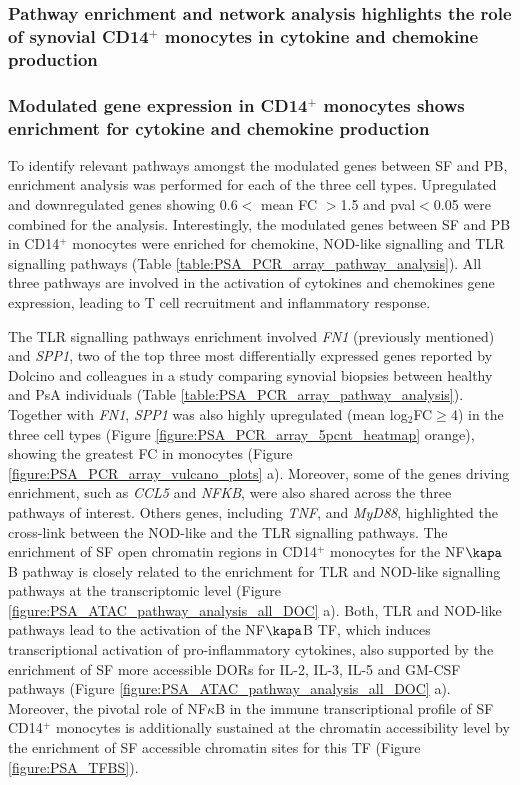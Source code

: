 \subsubsection{Pathway enrichment and network analysis highlights the role of synovial CD14$^+$ monocytes in cytokine and chemokine production}
\subsubsection{Modulated gene expression in CD14$^+$ monocytes shows enrichment for cytokine and chemokine production}
To identify relevant pathways amongst the modulated genes between SF and PB, enrichment analysis was performed for each of the three cell types. Upregulated and downregulated genes showing 0.6$<$ mean FC $>$1.5 and pval$<$0.05 were combined for the analysis. Interestingly, the modulated genes between SF and PB in CD14$^+$ monocytes were enriched for chemokine, NOD-like signalling and TLR signalling pathways (Table \ref{table:PSA_PCR_array_pathway_analysis}). All three pathways are involved in the activation of cytokines and chemokines gene expression, leading to T cell recruitment and inflammatory response. 

The TLR signalling pathways enrichment involved \textit{FN1} (previously mentioned) and \textit{SPP1}, two of the top three most differentially expressed genes reported by Dolcino and colleagues in a study comparing synovial biopsies between healthy and PsA individuals \parencite{Dolcino2015} (Table \ref{table:PSA_PCR_array_pathway_analysis}). Together with \textit{FN1}, \textit{SPP1} was also highly upregulated (mean log$_2$FC$\geq$4) in the three cell types (Figure \ref{figure:PSA_PCR_array_5pcnt_heatmap} orange), showing the greatest FC in monocytes (Figure \ref{figure:PSA_PCR_array_vulcano_plots} a). Moreover, some of the genes driving enrichment, such as \textit{CCL5} and \textit{NFKB}, were also shared across the three pathways of interest. Others genes, including \textit{TNF},  and \textit{MyD88}, highlighted the cross-link between the NOD-like and the TLR signalling pathways. The enrichment of SF open chromatin regions in CD14$^+$ monocytes for the NF$\kapa$B pathway is closely related to the enrichment for TLR and NOD-like signalling pathways at the transcriptomic level (Figure \ref{figure:PSA_ATAC_pathway_analysis_all_DOC} a). Both, TLR and NOD-like pathways lead to the activation of the NF$\kapa$B TF, which induces transcriptional activation of pro-inflammatory cytokines, also supported by the enrichment of SF more accessible DORs for IL-2, IL-3, IL-5 and GM-CSF pathways (Figure \ref{figure:PSA_ATAC_pathway_analysis_all_DOC} a). Moreover, the pivotal role of NF$\kappa$B in the immune transcriptional profile of SF CD14$^+$ monocytes  is additionally sustained at the chromatin accessibility level by the enrichment of SF accessible chromatin sites for this TF (Figure \ref{figure:PSA_TFBS}).  

